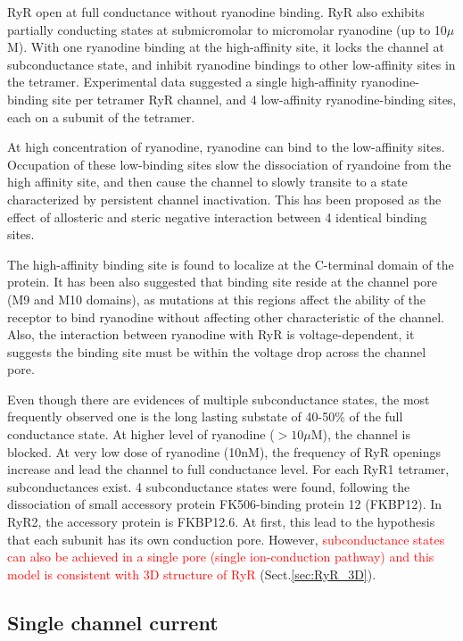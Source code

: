 RyR open at full conductance without ryanodine binding. RyR also exhibits
partially conducting states at submicromolar to micromolar ryanodine (up to
10$\mu$M). With one ryanodine binding at the high-affinity site, it locks the
channel at subconductance state, and inhibit ryanodine bindings to other
low-affinity sites in the tetramer. Experimental data suggested a single
high-affinity ryanodine-binding site per tetramer RyR channel, and 4
low-affinity ryanodine-binding sites, each on a subunit of the tetramer.

At high concentration of ryanodine, ryanodine can bind to the low-affinity
sites.  Occupation of these low-binding sites slow the dissociation of ryandoine
from the high affinity site, and then cause the channel to slowly transite to a
state characterized by persistent channel inactivation. This has been proposed
as the effect of allosteric and steric negative interaction between 4 identical
binding sites.   

\begin{framed}
The high-affinity binding site is found to localize at the C-terminal domain of
the protein. It has been also suggested that binding site reside at the channel
pore (M9 and M10 domains), as mutations at this regions affect the ability of
the receptor to bind ryanodine without affecting other characteristic of the
channel. Also, the interaction between ryanodine with RyR is voltage-dependent,
it suggests the binding site must be within the voltage drop across the channel
pore.
\end{framed}

Even though there are evidences of multiple subconductance states, the most
frequently observed one is the long lasting substate of 40-50\% of the full
conductance state. At higher level of ryanodine ($> 10\mu$M), the channel is
blocked.  At very low dose of ryanodine (10nM), the frequency of RyR openings
increase and lead the channel to full conductance level. For each RyR1 tetramer,
subconductances exist. 4 subconductance states were found, following the
dissociation of small accessory protein FK506-binding protein 12 (FKBP12). In
RyR2, the accessory protein is FKBP12.6.
At first, this lead to the hypothesis that each subunit has its own conduction
pore. However, \textcolor{red}{subconductance states can also be achieved in a
single pore (single ion-conduction pathway) and this model is consistent with 3D
structure of RyR} (Sect.\ref{sec:RyR_3D}).


\subsection{Single channel current}

